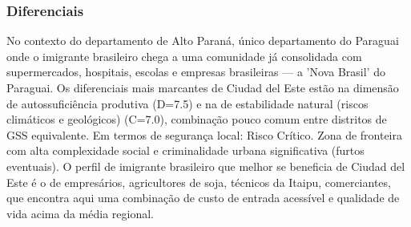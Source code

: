\subsubsection*{Diferenciais}\label{dif-ciudad-del-este-1001}
No contexto do departamento de Alto Paraná, único departamento do Paraguai onde o imigrante brasileiro chega a uma comunidade já consolidada com supermercados, hospitais, escolas e empresas brasileiras — a 'Nova Brasil' do Paraguai. Os diferenciais mais marcantes de Ciudad del Este estão na dimensão de autossuficiência produtiva (D=7.5) e na de estabilidade natural (riscos climáticos e geológicos) (C=7.0), combinação pouco comum entre distritos de GSS equivalente. Em termos de segurança local: Risco Crítico. Zona de fronteira com alta complexidade social e criminalidade urbana significativa (furtos eventuais). O perfil de imigrante brasileiro que melhor se beneficia de Ciudad del Este é o de empresários, agricultores de soja, técnicos da Itaipu, comerciantes, que encontra aqui uma combinação de custo de entrada acessível e qualidade de vida acima da média regional.
